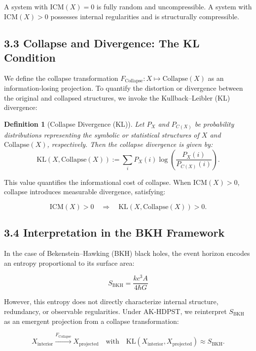 \documentclass[11pt]{article}
\newtheorem{definition}[theorem]{Definition}
\begin{document}
A system with \( \mathrm{ICM}(X) = 0 \) is fully random and uncompressible. A system with \( \mathrm{ICM}(X) > 0 \) possesses internal regularities and is structurally compressible.

\subsection*{3.3 Collapse and Divergence: The KL Condition}

We define the collapse transformation \( F_{\mathrm{Collapse}} : X \mapsto \mathrm{Collapse}(X) \) as an information-losing projection. To quantify the distortion or divergence between the original and collapsed structures, we invoke the Kullback–Leibler (KL) divergence:

\begin{definition}[Collapse Divergence (KL)]
Let \( P_X \) and \( P_{C(X)} \) be probability distributions representing the symbolic or statistical structures of \( X \) and \( \mathrm{Collapse}(X) \), respectively. Then the collapse divergence is given by:
\[
\mathrm{KL}(X, \mathrm{Collapse}(X)) := \sum_{i} P_X(i) \log \left( \frac{P_X(i)}{P_{C(X)}(i)} \right).
\]
\end{definition}

This value quantifies the informational cost of collapse. When \( \mathrm{ICM}(X) > 0 \), collapse introduces measurable divergence, satisfying:

\[
\mathrm{ICM}(X) > 0 \quad \Rightarrow \quad \mathrm{KL}(X, \mathrm{Collapse}(X)) > 0.
\]

\subsection*{3.4 Interpretation in the BKH Framework}

In the case of Bekenstein–Hawking (BKH) black holes, the event horizon encodes an entropy proportional to its surface area:

\[
S_{\mathrm{BKH}} = \frac{k c^3 A}{4 \hbar G}
\]

However, this entropy does not directly characterize internal structure, redundancy, or observable regularities. Under AK-HDPST, we reinterpret \( S_{\mathrm{BKH}} \) as an emergent projection from a collapse transformation:

\[
X_{\text{interior}} \xrightarrow{F_{\mathrm{Collapse}}} X_{\text{projected}} \quad \text{with} \quad \mathrm{KL}(X_{\text{interior}}, X_{\text{projected}}) \approx S_{\mathrm{BKH}}.
\]
\end{document}
